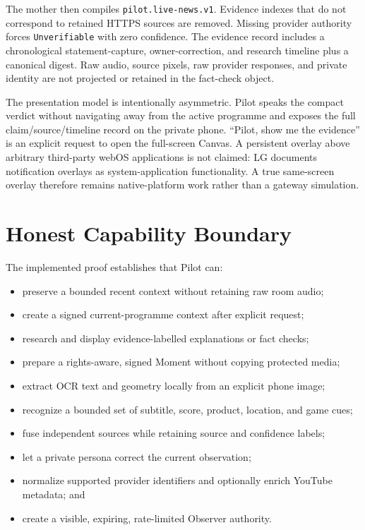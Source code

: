 \documentclass[11pt,a4paper]{article}
\begin{document}
The mother then compiles \texttt{pilot.live-news.v1}.  Evidence indexes that do
not correspond to retained HTTPS sources are removed.  Missing provider
authority forces \texttt{Unverifiable} with zero confidence.  The evidence
record includes a chronological statement-capture, owner-correction, and
research timeline plus a canonical digest.  Raw audio, source pixels, raw
provider responses, and private identity are not projected or retained in the
fact-check object.

The presentation model is intentionally asymmetric.  Pilot speaks the compact
verdict without navigating away from the active programme and exposes the full
claim/source/timeline record on the private phone.  ``Pilot, show me the
evidence'' is an explicit request to open the full-screen Canvas.  A persistent
overlay above arbitrary third-party webOS applications is not claimed: LG
documents notification overlays as system-application functionality.  A true
same-screen overlay therefore remains native-platform work rather than a
gateway simulation.

\section{Honest Capability Boundary}

The implemented proof establishes that Pilot can:

\begin{itemize}[leftmargin=*]
  \item preserve a bounded recent context without retaining raw room audio;
  \item create a signed current-programme context after explicit request;
  \item research and display evidence-labelled explanations or fact checks;
  \item prepare a rights-aware, signed Moment without copying protected media;
  \item extract OCR text and geometry locally from an explicit phone image;
  \item recognize a bounded set of subtitle, score, product, location, and game
        cues;
  \item fuse independent sources while retaining source and confidence labels;
  \item let a private persona correct the current observation;
  \item normalize supported provider identifiers and optionally enrich YouTube
        metadata; and
  \item create a visible, expiring, rate-limited Observer authority.
\end{itemize}
\end{document}
